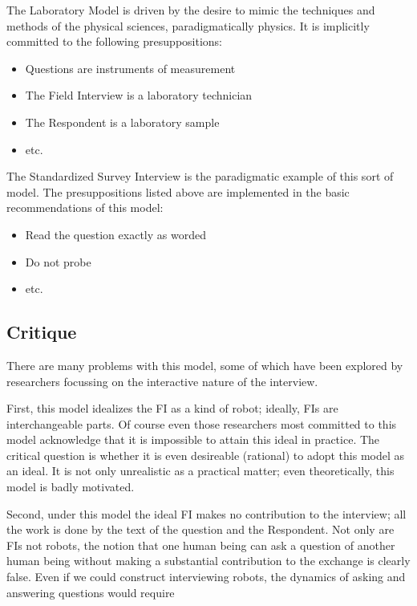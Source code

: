 \documentclass[11pt,twoside]{article}
\begin{document}
The Laboratory Model is driven by the desire to mimic the techniques
and methods of the physical sciences, paradigmatically physics.  It is
implicitly committed to the following presuppositions:

\begin{itemize}
\item Questions are instruments of measurement
\item The Field Interview is a laboratory technician
\item The Respondent is a laboratory sample
\item etc.
\end{itemize}

The Standardized Survey Interview is the paradigmatic example of this
sort of model.  The presuppositions listed above are implemented in
the basic recommendations of this model:

\begin{itemize}
\item Read the question exactly as worded
\item Do not probe
\item etc.
\end{itemize}

\subsection{Critique}

There are many problems with this model, some of which have been
explored by researchers focussing on the interactive nature of the
interview.

First, this model idealizes the FI as a kind of robot; ideally, FIs
are interchangeable parts.  Of course even those researchers most
committed to this model acknowledge that it is impossible to attain
this ideal in practice.  The critical question is whether it is even
desireable (rational) to adopt this model as an ideal.  It is not only
unrealistic as a practical matter; even theoretically, this model is
badly motivated.

Second, under this model the ideal FI makes no contribution to the
interview; all the work is done by the text of the question and the
Respondent.  Not only are FIs not robots, the notion that one human
being can ask a question of another human being without making a
substantial contribution to the exchange is clearly false.  Even if we
could construct interviewing robots, the dynamics of asking and
answering questions would require
\end{document}
